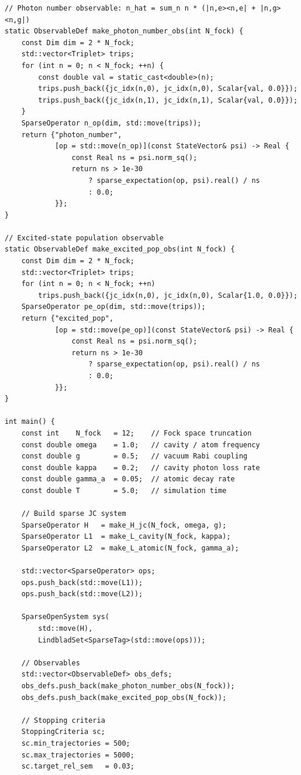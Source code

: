 \documentclass[11pt,a4paper,twoside]{book}
\theoremstyle{definition}
\theoremstyle{remark}
\begin{document}
\begin{verbatim}
// Photon number observable: n_hat = sum_n n * (|n,e><n,e| + |n,g><n,g|)
static ObservableDef make_photon_number_obs(int N_fock) {
    const Dim dim = 2 * N_fock;
    std::vector<Triplet> trips;
    for (int n = 0; n < N_fock; ++n) {
        const double val = static_cast<double>(n);
        trips.push_back({jc_idx(n,0), jc_idx(n,0), Scalar{val, 0.0}});
        trips.push_back({jc_idx(n,1), jc_idx(n,1), Scalar{val, 0.0}});
    }
    SparseOperator n_op(dim, std::move(trips));
    return {"photon_number",
            [op = std::move(n_op)](const StateVector& psi) -> Real {
                const Real ns = psi.norm_sq();
                return ns > 1e-30
                    ? sparse_expectation(op, psi).real() / ns
                    : 0.0;
            }};
}

// Excited-state population observable
static ObservableDef make_excited_pop_obs(int N_fock) {
    const Dim dim = 2 * N_fock;
    std::vector<Triplet> trips;
    for (int n = 0; n < N_fock; ++n)
        trips.push_back({jc_idx(n,0), jc_idx(n,0), Scalar{1.0, 0.0}});
    SparseOperator pe_op(dim, std::move(trips));
    return {"excited_pop",
            [op = std::move(pe_op)](const StateVector& psi) -> Real {
                const Real ns = psi.norm_sq();
                return ns > 1e-30
                    ? sparse_expectation(op, psi).real() / ns
                    : 0.0;
            }};
}

int main() {
    const int    N_fock   = 12;    // Fock space truncation
    const double omega    = 1.0;   // cavity / atom frequency
    const double g        = 0.5;   // vacuum Rabi coupling
    const double kappa    = 0.2;   // cavity photon loss rate
    const double gamma_a  = 0.05;  // atomic decay rate
    const double T        = 5.0;   // simulation time

    // Build sparse JC system
    SparseOperator H   = make_H_jc(N_fock, omega, g);
    SparseOperator L1  = make_L_cavity(N_fock, kappa);
    SparseOperator L2  = make_L_atomic(N_fock, gamma_a);

    std::vector<SparseOperator> ops;
    ops.push_back(std::move(L1));
    ops.push_back(std::move(L2));

    SparseOpenSystem sys(
        std::move(H),
        LindbladSet<SparseTag>(std::move(ops)));

    // Observables
    std::vector<ObservableDef> obs_defs;
    obs_defs.push_back(make_photon_number_obs(N_fock));
    obs_defs.push_back(make_excited_pop_obs(N_fock));

    // Stopping criteria
    StoppingCriteria sc;
    sc.min_trajectories = 500;
    sc.max_trajectories = 5000;
    sc.target_rel_sem   = 0.03;


\end{verbatim}
\end{document}
